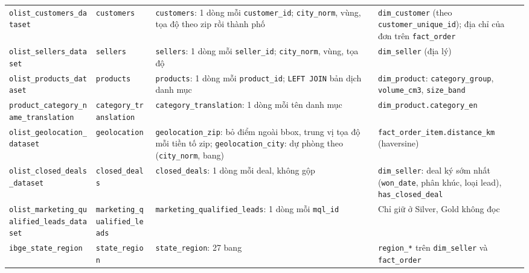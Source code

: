 \documentclass[a4paper]{article}
\begin{document}
{\begin{longtable}{@{}>{\raggedright\arraybackslash}p{3.0cm}>{\raggedright\arraybackslash}p{2.6cm}>{\raggedright\arraybackslash}p{5.4cm}>{\raggedright\arraybackslash}p{5.2cm}@{}}
\addlinespace
\texttt{olist\_\allowbreak{}customers\_\allowbreak{}dataset} & \texttt{customers} & \texttt{customers}: 1 dòng mỗi \texttt{customer\_\allowbreak{}id}; \texttt{city\_\allowbreak{}norm}, vùng, tọa độ theo zip rồi thành phố & \texttt{dim\_\allowbreak{}customer} (theo \texttt{customer\_\allowbreak{}unique\_\allowbreak{}id}); địa chỉ của đơn trên \texttt{fact\_\allowbreak{}order} \\
\addlinespace
\texttt{olist\_\allowbreak{}sellers\_\allowbreak{}dataset} & \texttt{sellers} & \texttt{sellers}: 1 dòng mỗi \texttt{seller\_\allowbreak{}id}; \texttt{city\_\allowbreak{}norm}, vùng, tọa độ & \texttt{dim\_\allowbreak{}seller} (địa lý) \\
\addlinespace
\texttt{olist\_\allowbreak{}products\_\allowbreak{}dataset} & \texttt{products} & \texttt{products}: 1 dòng mỗi \texttt{product\_\allowbreak{}id}; \texttt{LEFT JOIN} bản dịch danh mục & \texttt{dim\_\allowbreak{}product}: \texttt{category\_\allowbreak{}group}, \texttt{volume\_\allowbreak{}cm3}, \texttt{size\_\allowbreak{}band} \\
\addlinespace
\texttt{product\_\allowbreak{}category\_\allowbreak{}name\_\allowbreak{}translation} & \texttt{category\_\allowbreak{}translation} & \texttt{category\_\allowbreak{}translation}: 1 dòng mỗi tên danh mục & \texttt{dim\_\allowbreak{}product.category\_\allowbreak{}en} \\
\addlinespace
\texttt{olist\_\allowbreak{}geolocation\_\allowbreak{}dataset} & \texttt{geolocation} & \texttt{geolocation\_\allowbreak{}zip}: bỏ điểm ngoài bbox, trung vị tọa độ mỗi tiền tố zip; \texttt{geolocation\_\allowbreak{}city}: dự phòng theo (\texttt{city\_\allowbreak{}norm}, bang) & \texttt{fact\_\allowbreak{}order\_\allowbreak{}item.distance\_\allowbreak{}km} (haversine) \\
\addlinespace
\texttt{olist\_\allowbreak{}closed\_\allowbreak{}deals\_\allowbreak{}dataset} & \texttt{closed\_\allowbreak{}deals} & \texttt{closed\_\allowbreak{}deals}: 1 dòng mỗi deal, không gộp & \texttt{dim\_\allowbreak{}seller}: deal ký sớm nhất (\texttt{won\_\allowbreak{}date}, phân khúc, loại lead), \texttt{has\_\allowbreak{}closed\_\allowbreak{}deal} \\
\addlinespace
\texttt{olist\_\allowbreak{}marketing\_\allowbreak{}qualified\_\allowbreak{}leads\_\allowbreak{}dataset} & \texttt{marketing\_\allowbreak{}qualified\_\allowbreak{}leads} & \texttt{marketing\_\allowbreak{}qualified\_\allowbreak{}leads}: 1 dòng mỗi \texttt{mql\_\allowbreak{}id} & Chỉ giữ ở Silver, Gold không đọc \\
\addlinespace
\texttt{ibge\_\allowbreak{}state\_\allowbreak{}region} & \texttt{state\_\allowbreak{}region} & \texttt{state\_\allowbreak{}region}: 27 bang & \texttt{region\_\allowbreak{}*} trên \texttt{dim\_\allowbreak{}seller} và \texttt{fact\_\allowbreak{}order} \\
\end{longtable}
}
\end{document}
